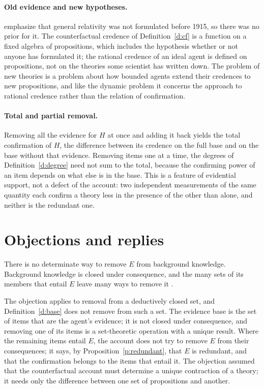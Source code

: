 \documentclass{situationist-preprint}
\begin{document}
\paragraph{Old evidence and new hypotheses.} \citet{WenmackersRomeijn2016} emphasize that general relativity was not formulated before 1915, so there was no prior for it. The counterfactual credence of Definition~\ref{d:cf} is a function on a fixed algebra of propositions, which includes the hypothesis whether or not anyone has formulated it; the rational credence of an ideal agent is defined on propositions, not on the theories some scientist has written down. The problem of new theories is a problem about how bounded agents extend their credences to new propositions, and like the dynamic problem it concerns the approach to rational credence rather than the relation of confirmation.

\paragraph{Total and partial removal.} Removing all the evidence for $H$ at once and adding it back yields the total confirmation of $H$, the difference between its credence on the full base and on the base without that evidence. Removing items one at a time, the degrees of Definition~\ref{d:degree} need not sum to the total, because the confirming power of an item depends on what else is in the base. This is a feature of evidential support, not a defect of the account: two independent measurements of the same quantity each confirm a theory less in the presence of the other than alone, and neither is the redundant one.

\section{Objections and replies}\label{s:objections}

\begin{objection}\label{o:indet}
There is no determinate way to remove $E$ from background knowledge. Background knowledge is closed under consequence, and the many sets of its members that entail $E$ leave many ways to remove it \citep{Glymour1980,Chihara1987}.
\end{objection}

\begin{reply}
The objection applies to removal from a deductively closed set, and Definition~\ref{d:base} does not remove from such a set. The evidence base is the set of items that are the agent's evidence; it is not closed under consequence, and removing one of its items is a set-theoretic operation with a unique result. Where the remaining items entail $E$, the account does not try to remove $E$ from their consequences; it says, by Proposition~\ref{p:redundant}, that $E$ is redundant, and that the confirmation belongs to the items that entail it. The objection assumed that the counterfactual account must determine a unique contraction of a theory; it needs only the difference between one set of propositions and another.
\end{reply}
\end{document}
